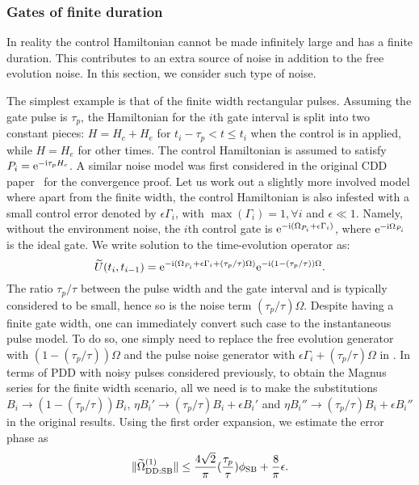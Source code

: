 \documentclass[pra,reprint,superscriptaddress]{revtex4-2}
\newcommand{\wt}[1]{\widetilde{#1}}
\newcommand{\rDD}{\mathrm{DD}}
\begin{document}
\subsubsection{Gates of finite duration}
In reality the control Hamiltonian cannot be made infinitely large and 
has a finite duration. This contributes to an extra source of noise in addition
to the free evolution noise.  In this section, we consider such type of noise. 

The simplest example is that of the finite width rectangular pulses. Assuming the gate pulse is $\tau_p$, the Hamiltonian  for the $i$th gate interval is split into two constant pieces: $H=H_c+H_e$ for $t_i -\tau_p  < t \le t_{i}$ when the control is in applied, while $H=H_e$ for other times. The control Hamiltonian is assumed to satisfy $P_i = \mathrm{e}^{-\mathrm{i} \tau_p H_c }$.
A similar noise model was first considered in the original CDD paper~\!\cite{khodjasteh2007performance} for the convergence proof. Let us work out a slightly more involved model where apart from the finite width, the control Hamiltonian is also infested with a small control error denoted by $\epsilon\Gamma_i$, with $\max{(\Gamma_i)}=1, \forall i$ and $\epsilon\ll 1$.  Namely, without the environment noise, the $i$th control gate
is $ \mathrm{e}^{-\mathrm{i} (\Omega_{P_i} +\epsilon \Gamma_i)}$, where $\mathrm{e}^{-\mathrm{i} \Omega_{P_i} }$ is the ideal gate. 
We write solution to the time-evolution operator as:
\begin{equation}
 \wt U(t_{i},t_{i-1}) =  \upe^{-\upi (\Omega_{P_i} +\epsilon \Gamma_i+
 (\tau_p/\tau) \Omega)}  \upe^{-\upi (1-(\tau_p/\tau)) \Omega}.
\end{equation}
The ratio $\tau_p/\tau$ between the pulse width and the gate interval and is typically considered to be small, hence so is the noise term $(\tau_p/\tau)\Omega$. Despite having a finite gate width,  one can immediately convert such case to the instantaneous pulse model.
To do so, one simply need to replace the free evolution generator with $ (1-(\tau_p/\tau)) \Omega$ and the pulse noise generator  with $\epsilon \Gamma_i + (\tau_p/\tau) \Omega$ in .
In terms of PDD with noisy pulses considered previously, to obtain the Magnus series for the finite width scenario, all we need is to make the substitutions $B_i \to (1-(\tau_p/\tau)) B_i$, $\eta B_i' \to (\tau_p/\tau) B_i + \epsilon B_i'$ and $\eta B_i'' \to (\tau_p/\tau) B_i + \epsilon B_i''$ in the original results. Using the first order expansion, we estimate the error phase as 
\begin{equation}
\norm{ \wt\Omega_{\rDD:\rSB}\up{1} }\le \frac{4\sqrt{2}}{\pi} (\frac{\tau_p}{\tau})\phi_\rSB +  \frac{8}{\pi} \epsilon.
\end{equation}
\end{document}
